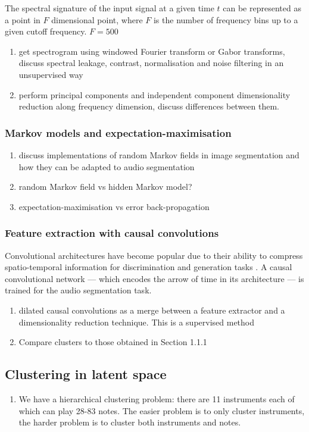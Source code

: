 \documentclass{article}[12pt]
\numberwithin{equation}{section}
\begin{document}
The spectral signature of the input signal at a given time $t$ can be
represented as a point in $F$ dimensional point, where $F$ is the number
of frequency bins up to a given cutoff frequency. $F=500$
\begin{enumerate}
	\item get spectrogram using windowed Fourier transform or Gabor transforms,
	discuss spectral leakage, contrast, normalisation and noise filtering in an
	unsupervised way
	\item perform principal components and independent component dimensionality
	reduction along frequency dimension, discuss differences between them.
\end{enumerate}
\subsubsection{Markov models and expectation-maximisation}
\begin{enumerate}
	\item discuss implementations of random Markov fields in image segmentation
	and how they can be adapted to audio segmentation
	\item random Markov field vs hidden Markov model?
	\item expectation-maximisation vs error back-propagation
\end{enumerate}
\subsubsection{Feature extraction with causal convolutions}
Convolutional architectures have become popular due to their ability to compress spatio-temporal
information for discrimination and generation tasks \cite{Oord2016a,Goodfellow}.
A causal convolutional network \cite{Oord2016} --- which encodes the arrow of time in
its architecture --- is trained for the audio segmentation task.
\begin{enumerate}
	\item dilated causal convolutions as a merge between a feature
	extractor and a dimensionality reduction technique. This is a supervised method
	\item Compare clusters to those obtained in Section 1.1.1
\end{enumerate}
\subsection{Clustering in latent space}
\begin{enumerate}
	\item We have a hierarchical clustering problem: there are 11 instruments each
	of which can play 28-83 notes. The easier problem is to only cluster instruments,
	the harder problem is to cluster both instruments and notes.
\end{enumerate}
\end{document}

